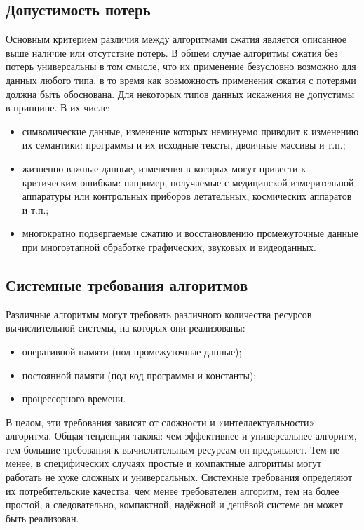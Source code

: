 \documentclass[a4paper]{report}
\begin{document}
\subsection{Допустимость потерь}
Основным критерием различия между алгоритмами сжатия является описанное выше наличие или отсутствие потерь. В общем случае алгоритмы сжатия без потерь универсальны в том смысле, что их применение безусловно возможно для данных любого типа, в то время как возможность применения сжатия с потерями должна быть обоснована. Для некоторых типов данных искажения не допустимы в принципе. В их числе:
\begin{itemize}
\item символические данные, изменение которых неминуемо приводит к изменению их семантики: программы и их исходные тексты, двоичные массивы и т.п.;
\item жизненно важные данные, изменения в которых могут привести к критическим ошибкам: например, получаемые с медицинской измерительной аппаратуры или контрольных приборов летательных, космических аппаратов и т.п.;
\item многократно подвергаемые сжатию и восстановлению промежуточные данные при многоэтапной обработке графических, звуковых и видеоданных.
\end{itemize}
\subsection{Системные требования алгоритмов}
Различные алгоритмы могут требовать различного количества ресурсов вычислительной системы, на которых они реализованы:
\begin{itemize}
\item оперативной памяти (под промежуточные данные);
\item постоянной памяти (под код программы и константы);
\item процессорного времени.

\end{itemize}
В целом, эти требования зависят от сложности и «интеллектуальности» алгоритма. Общая тенденция такова: чем эффективнее и универсальнее алгоритм, тем большие требования к вычислительным ресурсам он предъявляет. Тем не менее, в специфических случаях простые и компактные алгоритмы могут работать не хуже сложных и универсальных. Системные требования определяют их потребительские качества: чем менее требователен алгоритм, тем на более простой, а следовательно, компактной, надёжной и дешёвой системе он может быть реализован.
\end{document}
